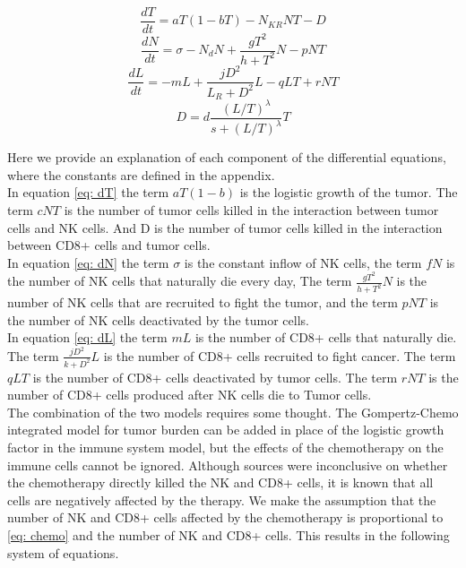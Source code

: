 \documentclass[11pt]{amsart}
\begin{document}
\begin{equation} \label{eq1}
	\frac{dT}{dt} = aT(1-bT) - N_{KR}NT - D 
	\end{equation}
	\begin{equation} \label{eq2}
	\frac{dN}{dt} = \sigma - N_dN +\frac{gT^2}{h + T^2}N - pNT
	\end{equation}
	\begin{equation} \label{eq3}
	\frac{dL}{dt} = - mL +\frac{jD^2}{L_R + D^2}L - qLT + rNT
	\end{equation}
	\begin{equation} \label{eq4}
	D = d\frac{(L/T)^\lambda}{s + (L/T)^\lambda}T
	\end{equation}

	Here we provide an explanation of each component of the differential equations, where the constants are defined in the appendix. \\
In equation \eqref{eq: dT} the term $aT(1-b)$ is the logistic growth of the tumor. The term $cNT$ is the number of tumor cells killed in the interaction between tumor cells and NK cells. And D is the number of tumor cells killed in the interaction between CD8+ cells and tumor cells. \\
In equation \eqref{eq: dN} the term $\sigma$ is the constant inflow of NK cells, the term $fN$ is the number of NK cells that naturally die every day, The term $\frac{gT^2}{h + T^2}N$ is the number of NK cells that are recruited to fight the tumor, and the term $pNT$ is the number of NK cells deactivated by the tumor cells.\\
In equation \eqref{eq: dL} the term $mL$ is the number of CD8+ cells that naturally die. The term $\frac{jD^2}{k + D^2}L$ is the number of CD8+ cells recruited to fight cancer. The term $qLT$ is the number of CD8+ cells deactivated by tumor cells. The term $rNT$ is the number of CD8+ cells produced after NK cells die to Tumor cells.\\


The combination of the two models requires some thought. The Gompertz-Chemo integrated model for tumor burden can be added in place of the logistic growth factor in the immune system model, but the effects of the chemotherapy on the immune cells cannot be ignored. Although sources were inconclusive on whether the chemotherapy directly killed the NK and CD8+ cells, it is known that all cells are negatively affected by the therapy. We make the assumption that the number of NK and CD8+ cells affected by the chemotherapy is proportional to \eqref{eq: chemo} and the number of NK and CD8+ cells. This results in the following system of equations.
\end{document}

